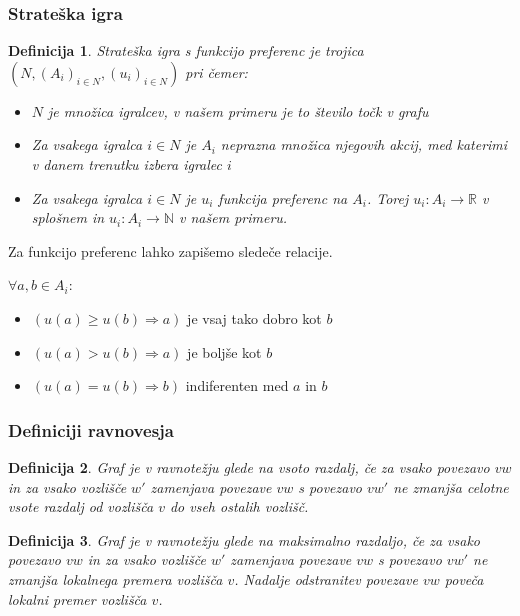 \documentclass[12pt, hyperref={unicode}]{beamer}
\newtheorem{definicija}{Definicija}
\begin{document}
\begin{frame}
   
  \frametitle{Strateška igra}
  \begin{definicija}
    Strateška igra s funkcijo preferenc je trojica $(N, (A_i)_{i\in N} , (u_i)_{i\in N})$ pri čemer:
\begin{itemize}
    \item $N$ je množica igralcev, v našem primeru je to število točk v grafu
    \item Za vsakega igralca $i \in N$ je $A_i$ neprazna množica njegovih akcij, med katerimi v danem trenutku izbera igralec $i$
    \item Za vsakega igralca $i \in N$ je $u_i$ funkcija preferenc na $A_i$. Torej $u_i : A_i \to \mathbb{R}$ v splošnem in $u_i : A_i \to \mathbb{N}$ v našem primeru.
\end{itemize}
\end{definicija}
Za funkcijo preferenc lahko zapišemo sledeče relacije.

$\forall a,b \in A_i:$
\begin{itemize}
    \item $(u(a) \geq u(b) \Rightarrow a)$ je vsaj tako dobro kot $b$
    \item $(u(a) > u(b) \Rightarrow a)$ je boljše kot $b$
    \item $(u(a) = u(b) \Rightarrow b)$ indiferenten med $a$ in $b$
\end{itemize}

\end{frame}

\begin{frame}
   
    \frametitle{Definiciji ravnovesja}
    \begin{definicija}
    Graf je v \textit{ravnotežju glede na vsoto razdalj}, če za vsako povezavo $vw$ in
    za vsako vozlišče $w'$ zamenjava povezave $vw$ s povezavo $vw'$ ne zmanjša
    celotne vsote razdalj od vozlišča $v$ do vseh ostalih vozlišč.
    \end{definicija}
        
    \begin{definicija}
    Graf je v \textit{ravnotežju glede na maksimalno razdaljo}, če za vsako povezavo $vw$
    in za vsako vozlišče $w'$ zamenjava povezave $vw$ s povezavo $vw'$ ne zmanjša
    lokalnega premera vozlišča $v$. Nadalje odstranitev povezave $vw$ poveča
    lokalni premer vozlišča $v$.
    \end{definicija}

\end{frame}
\end{document}
